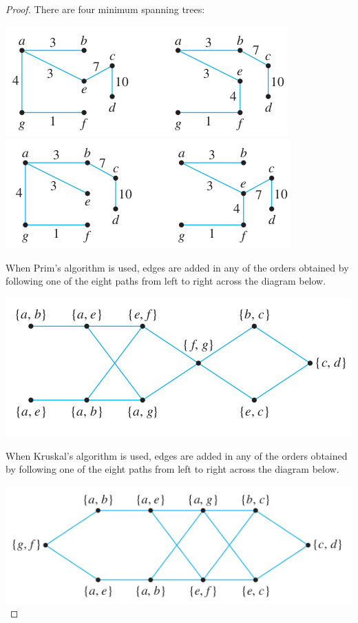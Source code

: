 \documentclass[14pt]{extarticle}
\begin{document}
\begin{proof}
There are four minimum spanning trees:

\includegraphics[scale=0.5]{../images/10.6.9.a.png}
\includegraphics[scale=0.5]{../images/10.6.9.b.png}

When Prim’s algorithm is used, edges are added in any of the orders obtained by following one of the eight paths from left 
to right across the diagram below.

\includegraphics[scale=0.5]{../images/10.6.9.c.png}

When Kruskal’s algorithm is used, edges are added in any of the orders obtained by following one of the eight paths from 
left to right across the diagram below.

\includegraphics[scale=0.5]{../images/10.6.9.d.png}
\end{proof}
\end{document}
